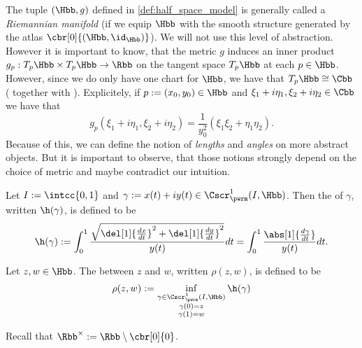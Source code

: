 \begin{remark}
	The tuple $(\Hbb,g)$ defined in \ref{def:half_space_model} is generally called a \emph{Riemannian manifold} (if we equip $\Hbb$ with the smooth structure generated by the atlas $\cbr[0]{(\Hbb,\id_\Hbb)}$). We will not use this level of abstraction. However it is important to know, that the metric $g$ induces an inner product $g_p: T_p\Hbb \times T_p\Hbb \to \Rbb$ on the tangent space $T_p\Hbb$ at each $p \in \Hbb$. However, since we do only have one chart for $\Hbb$, we have that $T_p\Hbb \cong \Cbb$ (\cite[56]{lee:smooth_manifolds:2013} together with \cite[53]{lee:smooth_manifolds:2013}). Explicitely, if $p := (x_0,y_0) \in \Hbb$ and $\xi_1 + i\eta_1,\xi_2 + i\eta_2 \in \Cbb$ we have that
	\begin{equation}
		g_p(\xi_1 + i\eta_1, \xi_2 + i\eta_2) = \frac{1}{y_0^2}(\xi_1\xi_2 + \eta_1\eta_2).
	\end{equation}
	Because of this, we can define the notion of \emph{lengths} and \emph{angles} on more abstract objects. But it is important to observe, that those notions strongly depend on the choice of metric and maybe contradict our intuition. 
\end{remark}

\begin{definition}
	Let $I := \intcc{0,1}$ and $\gamma := x(t) + iy(t) \in \Cscr^1_{\pwrm}(I,\Hbb)$. Then the  of $\gamma$, written $\h(\gamma)$, is defined to be
	\begin{equation}
		\h(\gamma) := \int_0^1 \frac{\sqrt{\del[1]{\frac{dx}{dt}}^2 + \del[1]{\frac{dy}{dt}}^2}}{y(t)} dt = \int_0^1 \frac{\abs[1]{\frac{d\gamma}{dt}}}{y(t)}dt.
	\end{equation}
\end{definition}

\begin{definition}
	Let $z,w \in \Hbb$. The  between $z$ and $w$, written $\rho(z,w)$, is defined to be
	\begin{equation}
		\rho(z,w) := \inf_{\substack{\gamma \in \Cscr^1_\pwrm(I,\Hbb)\\ \gamma(0) = z\\ \gamma(1) = w}} \h(\gamma)
	\end{equation}
\end{definition}

Recall that $\Rbb^\times := \Rbb \setminus \cbr[0]{0}$.

